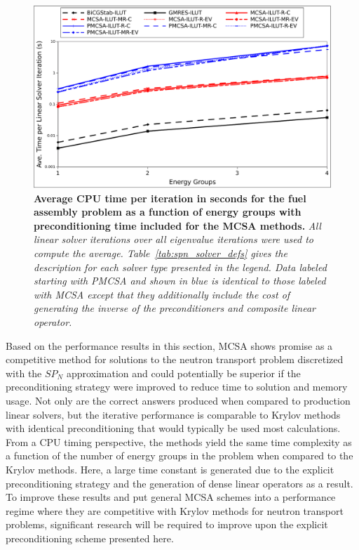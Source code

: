 \begin{figure}[t!]
  \begin{center}
    \includegraphics[width=5in]{chapters/spn_equations/solver_p_time.pdf}
  \end{center}
  \caption{\textbf{Average CPU time per iteration in seconds for the
      fuel assembly problem as a function of energy groups with
      preconditioning time included for the MCSA methods.}
    \textit{All linear solver iterations over all eigenvalue
      iterations were used to compute the
      average. Table~\ref{tab:spn_solver_defs} gives the description
      for each solver type presented in the legend. Data labeled
      starting with PMCSA and shown in blue is identical to those
      labeled with MCSA except that they additionally include the cost
      of generating the inverse of the preconditioners and composite
      linear operator.}}
  \label{fig:spn_comparison_prec_time}
\end{figure}

Based on the performance results in this section, MCSA shows promise
as a competitive method for solutions to the neutron transport problem
discretized with the $SP_N$ approximation and could potentially be
superior if the preconditioning strategy were improved to reduce time
to solution and memory usage. Not only are the correct answers
produced when compared to production linear solvers, but the iterative
performance is comparable to Krylov methods with identical
preconditioning that would typically be used most calculations. From a
CPU timing perspective, the methods yield the same time complexity as
a function of the number of energy groups in the problem when compared
to the Krylov methods. Here, a large time constant is generated due to
the explicit preconditioning strategy and the generation of dense
linear operators as a result. To improve these results and put general
MCSA schemes into a performance regime where they are competitive with
Krylov methods for neutron transport problems, significant research
will be required to improve upon the explicit preconditioning scheme
presented here.

